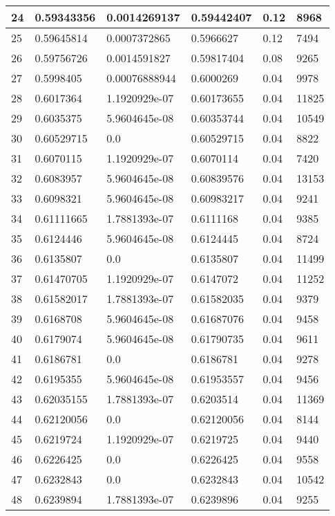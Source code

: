 \begin{longtable}{|l|l|l|l|l|l|}
24 & 0.59343356 & 0.0014269137 & 0.59442407 & 0.12 & 8968 \\ \hline 
25 & 0.59645814 & 0.0007372865 & 0.5966627 & 0.12 & 7494 \\ \hline 
26 & 0.59756726 & 0.0014591827 & 0.59817404 & 0.08 & 9265 \\ \hline 
27 & 0.5998405 & 0.00076888944 & 0.6000269 & 0.04 & 9978 \\ \hline 
28 & 0.6017364 & 1.1920929e-07 & 0.60173655 & 0.04 & 11825 \\ \hline 
29 & 0.6035375 & 5.9604645e-08 & 0.60353744 & 0.04 & 10549 \\ \hline 
30 & 0.60529715 & 0.0 & 0.60529715 & 0.04 & 8822 \\ \hline 
31 & 0.6070115 & 1.1920929e-07 & 0.6070114 & 0.04 & 7420 \\ \hline 
32 & 0.6083957 & 5.9604645e-08 & 0.60839576 & 0.04 & 13153 \\ \hline 
33 & 0.6098321 & 5.9604645e-08 & 0.60983217 & 0.04 & 9241 \\ \hline 
34 & 0.61111665 & 1.7881393e-07 & 0.6111168 & 0.04 & 9385 \\ \hline 
35 & 0.6124446 & 5.9604645e-08 & 0.6124445 & 0.04 & 8724 \\ \hline 
36 & 0.6135807 & 0.0 & 0.6135807 & 0.04 & 11499 \\ \hline 
37 & 0.61470705 & 1.1920929e-07 & 0.6147072 & 0.04 & 11252 \\ \hline 
38 & 0.61582017 & 1.7881393e-07 & 0.61582035 & 0.04 & 9379 \\ \hline 
39 & 0.6168708 & 5.9604645e-08 & 0.61687076 & 0.04 & 9458 \\ \hline 
40 & 0.6179074 & 5.9604645e-08 & 0.61790735 & 0.04 & 9611 \\ \hline 
41 & 0.6186781 & 0.0 & 0.6186781 & 0.04 & 9278 \\ \hline 
42 & 0.6195355 & 5.9604645e-08 & 0.61953557 & 0.04 & 9456 \\ \hline 
43 & 0.62035155 & 1.7881393e-07 & 0.6203514 & 0.04 & 11369 \\ \hline 
44 & 0.62120056 & 0.0 & 0.62120056 & 0.04 & 8144 \\ \hline 
45 & 0.6219724 & 1.1920929e-07 & 0.6219725 & 0.04 & 9440 \\ \hline 
46 & 0.6226425 & 0.0 & 0.6226425 & 0.04 & 9558 \\ \hline 
47 & 0.6232843 & 0.0 & 0.6232843 & 0.04 & 10542 \\ \hline 
48 & 0.6239894 & 1.7881393e-07 & 0.6239896 & 0.04 & 9255 \\ \hline 

\end{longtable}
